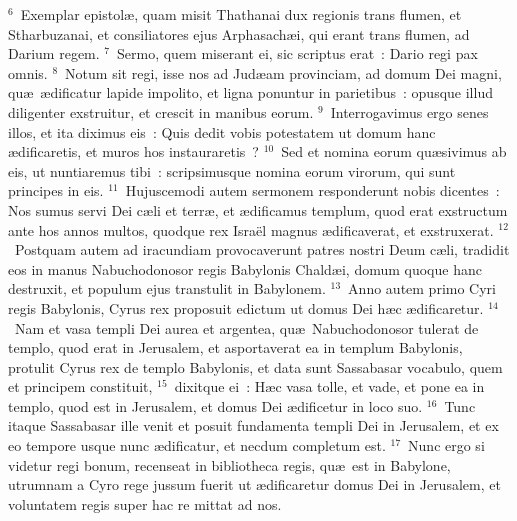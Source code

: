 ${}^{6}$~Exemplar epistol\ae , quam misit Thathanai dux regionis trans flumen, et Stharbuzanai, et consiliatores ejus Arphasach\ae i, qui erant trans flumen, ad Darium regem.
${}^{7}$~Sermo, quem miserant ei, sic scriptus erat~: Dario regi pax omnis.
${}^{8}$~Notum sit regi, isse nos ad Jud\ae am provinciam, ad domum Dei magni, qu\ae\ \ae dificatur lapide impolito, et ligna ponuntur in parietibus~: opusque illud diligenter exstruitur, et crescit in manibus eorum.
${}^{9}$~Interrogavimus ergo senes illos, et ita diximus eis~: Quis dedit vobis potestatem ut domum hanc \ae dificaretis, et muros hos instauraretis~?
${}^{10}$~Sed et nomina eorum qu\ae sivimus ab eis, ut nuntiaremus tibi~: scripsimusque nomina eorum virorum, qui sunt principes in eis.
${}^{11}$~Hujuscemodi autem sermonem responderunt nobis dicentes~: Nos sumus servi Dei c\ae li et terr\ae , et \ae dificamus templum, quod erat exstructum ante hos annos multos, quodque rex Isra\"el magnus \ae dificaverat, et exstruxerat.
${}^{12}$~Postquam autem ad iracundiam provocaverunt patres nostri Deum c\ae li, tradidit eos in manus Nabuchodonosor regis Babylonis Chald\ae i, domum quoque hanc destruxit, et populum ejus transtulit in Babylonem.
${}^{13}$~Anno autem primo Cyri regis Babylonis, Cyrus rex proposuit edictum ut domus Dei h\ae c \ae dificaretur.
${}^{14}$~Nam et vasa templi Dei aurea et argentea, qu\ae\ Nabuchodonosor tulerat de templo, quod erat in Jerusalem, et asportaverat ea in templum Babylonis, protulit Cyrus rex de templo Babylonis, et data sunt Sassabasar vocabulo, quem et principem constituit,
${}^{15}$~dixitque ei~: H\ae c vasa tolle, et vade, et pone ea in templo, quod est in Jerusalem, et domus Dei \ae dificetur in loco suo.
${}^{16}$~Tunc itaque Sassabasar ille venit et posuit fundamenta templi Dei in Jerusalem, et ex eo tempore usque nunc \ae dificatur, et necdum completum est.
${}^{17}$~Nunc ergo si videtur regi bonum, recenseat in bibliotheca regis, qu\ae\ est in Babylone, utrumnam a Cyro rege jussum fuerit ut \ae dificaretur domus Dei in Jerusalem, et voluntatem regis super hac re mittat ad nos.

